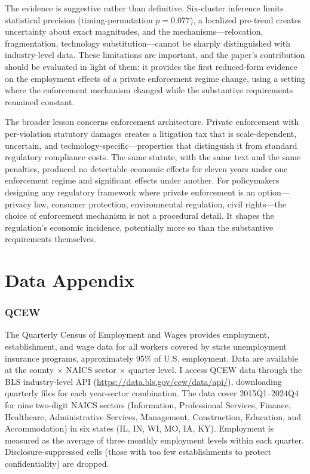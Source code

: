 \documentclass[12pt]{article}
\begin{document}
The evidence is suggestive rather than definitive. Six-cluster inference limits statistical precision (timing-permutation $p = 0.077$), a localized pre-trend creates uncertainty about exact magnitudes, and the mechanisms---relocation, fragmentation, technology substitution---cannot be sharply distinguished with industry-level data. These limitations are important, and the paper's contribution should be evaluated in light of them: it provides the first reduced-form evidence on the employment effects of a private enforcement regime change, using a setting where the enforcement mechanism changed while the substantive requirements remained constant.

The broader lesson concerns enforcement architecture. Private enforcement with per-violation statutory damages creates a litigation tax that is scale-dependent, uncertain, and technology-specific---properties that distinguish it from standard regulatory compliance costs. The same statute, with the same text and the same penalties, produced no detectable economic effects for eleven years under one enforcement regime and significant effects under another. For policymakers designing any regulatory framework where private enforcement is an option---privacy law, consumer protection, environmental regulation, civil rights---the choice of enforcement mechanism is not a procedural detail. It shapes the regulation's economic incidence, potentially more so than the substantive requirements themselves.

\label{apep_main_text_end}



\newpage
\appendix

\section{Data Appendix}
\label{sec:data_appendix}

\subsubsection*{QCEW} The Quarterly Census of Employment and Wages provides employment, establishment, and wage data for all workers covered by state unemployment insurance programs, approximately 95\% of U.S. employment. Data are available at the county $\times$ NAICS sector $\times$ quarter level. I access QCEW data through the BLS industry-level API (\url{https://data.bls.gov/cew/data/api/}), downloading quarterly files for each year-sector combination. The data cover 2015Q1--2024Q4 for nine two-digit NAICS sectors (Information, Professional Services, Finance, Healthcare, Administrative Services, Management, Construction, Education, and Accommodation) in six states (IL, IN, WI, MO, IA, KY). Employment is measured as the average of three monthly employment levels within each quarter. Disclosure-suppressed cells (those with too few establishments to protect confidentiality) are dropped.
\end{document}
